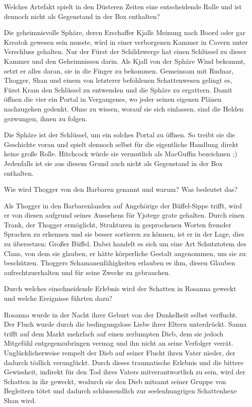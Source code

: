 \documentclass[10pt, a4paper, oneside]{book}
\begin{document}
\begin{multicols}{2}
Welches Artefakt spielt in den Düsteren Zeiten eine entscheidende Rolle und ist dennoch nicht als Gegenstand in der Box enthalten?\bigskip

Die geheimnisvolle Sphäre, deren Erschaffer Kjalls Meinung nach Boord oder gar Kreatok gewesen sein musste, wird in einer verborgenen Kammer in Cavern unter Verschluss gehalten. Nur der Fürst der Schildzwerge hat einen Schlüssel zu dieser Kammer und den Geheimnissen darin. Als Kjall von der Sphäre Wind bekommt, setzt er alles daran, sie in die Finger zu bekommen. Gemeinsam mit Rudnar, Thogger, Shan und einem von letzterer befohlenen Schattenwesen gelingt es, Fürst Kram den Schlüssel zu entwenden und die Sphäre zu ergattern. Damit öffnen die vier ein Portal in Vergangenes, wo jeder seinen eigenen Plänen nachzugehen gedenkt. Ohne zu wissen, worauf sie sich einlassen, sind die Helden gezwungen, ihnen zu folgen.

Die Sphäre ist der Schlüssel, um ein solches Portal zu öffnen. So treibt sie die Geschichte voran und spielt dennoch selbst für die eigentliche Handlung direkt keine große Rolle. Hitchcock würde sie vermutlich als MacGuffin bezeichnen ;) Jedenfalls ist sie aus diesem Grund auch nicht als Gegenstand in der Box enthalten.\bigskip

Wie wird Thogger von den Barbaren genannt und warum? Was bedeutet das?\bigskip

Als Thogger in den Barbarenlanden auf Angehörige der Büffel-Sippe trifft, wird er von diesen aufgrund seines Aussehens für Yjotege grate gehalten. Durch einen Trank, der Thogger ermöglicht, Strukturen in gesprochenen Worten fremder Sprachen zu erkennen und sie besser sortieren zu können, ist er in der Lage, dies zu übersetzen: Großer Büffel. Dabei handelt es sich um eine Art Schutztotem des Clans, von dem sie glauben, er hätte körperliche Gestalt angenommen, um sie zu beschützen. Thoggers Schamanenfähigkeiten erlauben es ihm, diesen Glauben aufrechtzuerhalten und für seine Zwecke zu gebrauchen.\bigskip

Durch welches einschneidende Erlebnis wird der Schatten in Rosanna geweckt und welche Ereignisse führten dazu?\bigskip

Rosanna wurde in der Nacht ihrer Geburt von der Dunkelheit selbst verflucht. Der Fluch wurde durch die bedingungslose Liebe ihrer Eltern unterdrückt. Sanna trifft auf dem Markt mehrfach auf einen zerlumpten Dieb, dem sie jedoch Mitgefühl entgegenzubringen vermag und ihn nicht an seine Verfolger verrät. Unglücklicherweise rempelt der Dieb auf seiner Flucht ihren Vater nieder, der dadurch tödlich verunglückt. Durch dieses traumatische Erlebnis und die bittere Gewissheit, indirekt für den Tod ihres Vaters mitverantwortlich zu sein, wird der Schatten in ihr geweckt, wodurch sie den Dieb mitsamt seiner Gruppe von Begleitern tötet und dadurch schlussendlich zur seelenhungrigen Schattenhexe Shan wird.\bigskip


\end{multicols}
\end{document}
